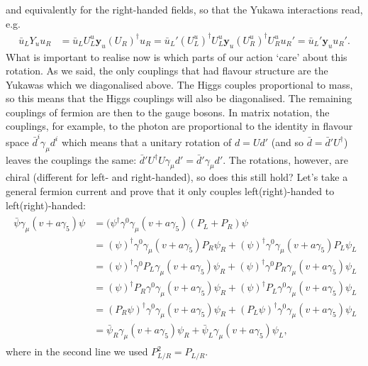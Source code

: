 \documentclass[relqm.tex]{subfiles}
\begin{document}
and equivalently for the right-handed fields, so that the Yukawa interactions read, e.g.
\begin{align}
    \bar{u}_LY_uu_R &= \bar{u}_LU_L^u\mathbf{y}_u(U_R)^\dagger u_R = \bar{u}_L'(U_L^u)^\dagger U_L^u\mathbf{y}_u(U_R^u)^\dagger U_R^uu_R' = \bar{u}_L'\mathbf{y}_uu_R'.
\end{align}
What is important to realise now is which parts of our action `care' about this rotation. 
As we said, the only couplings that had flavour structure are the Yukawas which we diagonalised above. 
The Higgs couples proportional to mass, so this means that the Higgs couplings will also be diagonalised. 
The remaining couplings of fermion are then to the gauge bosons. 
In matrix notation, the couplings, for example, to the photon are proportional to the identity in flavour space $\bar{d}^i\gamma_\mu d^i$ which means that a unitary rotation of $d=Ud'$ (and so $\bar{d}=\bar{d}'U^\dagger$) leaves the couplings the same: $\bar{d}'U^\dagger U\gamma_\mu d'=\bar{d}'\gamma_\mu d'$.
The rotations, however, are chiral (different for left- and right-handed), so does this still hold?
Let's take a general fermion current and prove that it only couples left(right)-handed to left(right)-handed:
\begin{align}
    \begin{split}
        \bar{\psi}\gamma_\mu(v+a\gamma_5)\psi &= (\psi^\dagger\gamma^0\gamma_\mu(v+a\gamma_5)(P_L+P_R)\psi \\
                                              &= (\psi)^\dagger\gamma^0\gamma_\mu(v+a\gamma_5)P_R\psi_R + (\psi)^\dagger\gamma^0\gamma_\mu(v+a\gamma_5)P_L\psi_L \\
                                              &= (\psi)^\dagger\gamma^0P_L\gamma_\mu(v+a\gamma_5)\psi_R + (\psi)^\dagger\gamma^0P_R\gamma_\mu(v+a\gamma_5)\psi_L \\
                                              &= (\psi)^\dagger P_R\gamma^0\gamma_\mu(v+a\gamma_5)\psi_R + (\psi)^\dagger P_L\gamma^0\gamma_\mu(v+a\gamma_5)\psi_L \\
                                              &= (P_R\psi)^\dagger\gamma^0\gamma_\mu(v+a\gamma_5)\psi_R + (P_L\psi)^\dagger\gamma^0\gamma_\mu(v+a\gamma_5)\psi_L \\
                                              &= \bar{\psi}_R\gamma_\mu(v+a\gamma_5)\psi_R + \bar{\psi}_L\gamma_\mu(v+a\gamma_5)\psi_L,
    \end{split}
\end{align}
where in the second line we used $P_{L/R}^2=P_{L/R}$.
\end{document}
